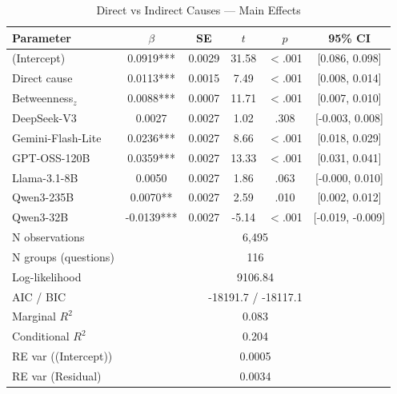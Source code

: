 \begin{table}[htbp]
\centering
\small
\caption{Direct vs Indirect Causes --- Main Effects}
\label{tab:lme_direct_main}
\begin{tabular}{lccccc}
\toprule
Parameter & $\beta$ & SE & $t$ & $p$ & 95\% CI \\
\midrule
  (Intercept) & 0.0919*** & 0.0029 & 31.58 & $<$.001 & [0.086, 0.098] \\
  Direct cause & 0.0113*** & 0.0015 & 7.49 & $<$.001 & [0.008, 0.014] \\
  Betweenness$_z$ & 0.0088*** & 0.0007 & 11.71 & $<$.001 & [0.007, 0.010] \\
  DeepSeek-V3 & 0.0027 & 0.0027 & 1.02 & .308 & [-0.003, 0.008] \\
  Gemini-Flash-Lite & 0.0236*** & 0.0027 & 8.66 & $<$.001 & [0.018, 0.029] \\
  GPT-OSS-120B & 0.0359*** & 0.0027 & 13.33 & $<$.001 & [0.031, 0.041] \\
  Llama-3.1-8B & 0.0050 & 0.0027 & 1.86 & .063 & [-0.000, 0.010] \\
  Qwen3-235B & 0.0070** & 0.0027 & 2.59 & .010 & [0.002, 0.012] \\
  Qwen3-32B & -0.0139*** & 0.0027 & -5.14 & $<$.001 & [-0.019, -0.009] \\
\midrule
  N observations & \multicolumn{5}{c}{6{,}495} \\
  N groups (questions) & \multicolumn{5}{c}{116} \\
  Log-likelihood & \multicolumn{5}{c}{9106.84} \\
  AIC / BIC & \multicolumn{5}{c}{-18191.7 / -18117.1} \\
  Marginal $R^2$ & \multicolumn{5}{c}{0.083} \\
  Conditional $R^2$ & \multicolumn{5}{c}{0.204} \\
  RE var ((Intercept)) & \multicolumn{5}{c}{0.0005} \\
  RE var (Residual) & \multicolumn{5}{c}{0.0034} \\
\bottomrule
\end{tabular}
\end{table}
